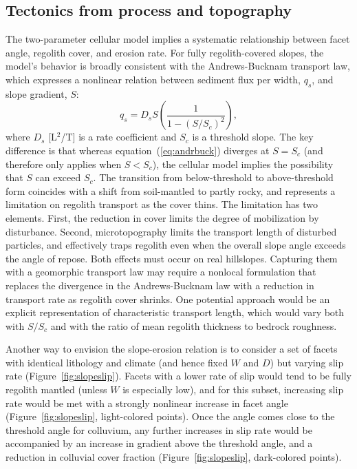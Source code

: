 \subsection{Tectonics from process and topography}

The two-parameter cellular model implies a systematic relationship between facet angle, regolith cover, and erosion rate. For fully regolith-covered slopes, the model's behavior is broadly consistent with the Andrews-Bucknam transport law, which expresses a nonlinear relation between sediment flux per width, $q_s$, and slope gradient, $S$:
\begin{equation}
q_s = D_s S \left( \frac{1}{1-(S/S_c)^2} \right),
\label{eq:andrbuck}
\end{equation}
where $D_s$ [L$^2$/T] is a rate coefficient and $S_c$ is a threshold slope. The key difference is that whereas equation~(\ref{eq:andrbuck}) diverges at $S=S_c$ (and therefore only applies when $S<S_c$), the cellular model implies the possibility that $S$ can exceed $S_c$. The transition from below-threshold to above-threshold form coincides with a shift from soil-mantled to partly rocky, and represents a limitation on regolith transport as the cover thins. The limitation has two elements. First, the reduction in cover limits the degree of mobilization by disturbance. Second, microtopography limits the transport length of disturbed particles, and effectively traps regolith even when the overall slope angle exceeds the angle of repose. Both effects must occur on real hillslopes. Capturing them with a geomorphic transport law may require a nonlocal formulation that replaces the divergence in the Andrews-Bucknam law with a reduction in transport rate as regolith cover shrinks. One potential approach would be an explicit representation of characteristic transport length, which would vary both with $S/S_c$ and with the ratio of mean regolith thickness to bedrock roughness.

Another way to envision the slope-erosion relation is to consider a set of facets with identical lithology and climate (and hence fixed $W$ and $D$) but varying slip rate (Figure~\ref{fig:slopeslip}). Facets with a lower rate of slip would tend to be fully regolith mantled (unless $W$ is especially low), and for this subset, increasing slip rate would be met with a strongly nonlinear increase in facet angle (Figure~\ref{fig:slopeslip}, light-colored points). Once the angle comes close to the threshold angle for colluvium, any further increases in slip rate would be accompanied by an increase in gradient above the threshold angle, and a reduction in colluvial cover fraction (Figure~\ref{fig:slopeslip}, dark-colored points).

